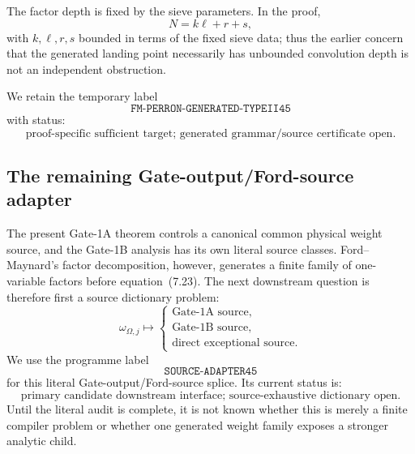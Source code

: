 \documentclass[11pt]{article}
\theoremstyle{definition}
\newcommand{\1}{\mathbf 1}
\begin{document}
The factor depth is fixed by the sieve parameters.  In the proof,
\[
   N=k\ell+r+s,
\]
with $k,\ell,r,s$ bounded in terms of the fixed sieve data; thus the earlier
concern that the generated landing point necessarily has unbounded convolution
depth is not an independent obstruction.

We retain the temporary label
\[
   \boxed{\texttt{FM-PERRON-GENERATED-TYPEII45}}
\]
with status:
\[
   \boxed{\text{proof-specific sufficient target; generated grammar/source certificate open}.}
\]

\subsection{The remaining Gate-output/Ford-source adapter}
The present Gate-1A theorem controls a canonical common physical weight source,
and the Gate-1B analysis has its own literal source classes.  Ford--Maynard's
factor decomposition, however, generates a finite family of one-variable
factors before equation~(7.23).  The next downstream question is therefore
first a source dictionary problem:
\[
   \omega_{\Omega,j}\longmapsto
   \begin{cases}
     \text{Gate-1A source},\\
     \text{Gate-1B source},\\
     \text{direct exceptional source}.
   \end{cases}
\]
We use the programme label
\[
   \boxed{\texttt{SOURCE-ADAPTER45}}
\]
for this literal Gate-output/Ford-source splice.  Its current status is:
\[
   \boxed{\text{primary candidate downstream interface; source-exhaustive dictionary open}.}
\]
Until the literal audit is complete, it is not known whether this is merely a
finite compiler problem or whether one generated weight family exposes a
stronger analytic child.
\end{document}
